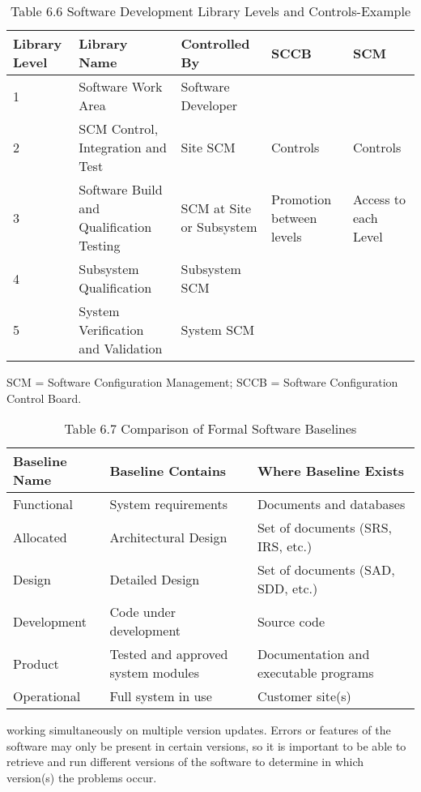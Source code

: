 \documentclass[8pt,twocolumn]{amsart}
\theoremstyle{plain}
\begin{document}
\begin{table*}[!h]
\caption{Table 6.6 Software Development Library Levels and Controls-Example}
\begin{adjustbox}{width=1\textwidth}
\begin{tabular}{|p{1.5cm}|l|l|p{3cm}|l|}
\hline
Library Level &Library Name & Controlled By & SCCB & SCM\\
\hline
1& Software Work Area & Software Developer &  & \\
\cline{1-3}
2& SCM Control, Integration and Test & Site SCM & Controls & Controls\\
\cline{1-3}
3& Software Build and Qualification Testing & SCM at Site or Subsystem & Promotion between levels & Access to each Level\\
\cline{1-3}
4& Subsystem Qualification & Subsystem SCM & &\\
\cline{1-3}
5& System Verification and Validation & System SCM &&\\
\hline
\end{tabular}
\end{adjustbox}
SCM = Software Configuration Management; SCCB = Software Configuration Control Board.
\end{table*}

\begin{table*}[h!]
\caption{Table 6.7 Comparison of Formal Software Baselines}
\begin{adjustbox}{width=1\textwidth}
\begin{tabular}{|l|l|l|}
\hline
Baseline Name & Baseline Contains & Where Baseline Exists\\
\hline
Functional & System requirements & Documents and databases \\
\hline
Allocated& Architectural Design & Set of documents (SRS, IRS, etc.)\\
\hline
Design& Detailed Design & Set of documents (SAD, SDD, etc.)\\
\hline
Development& Code under development & Source code \\
\hline
Product& Tested and approved system modules & Documentation and executable programs\\
\hline
Operational & Full system in use & Customer site(s)\\
\hline
\end{tabular}
\end{adjustbox}
\end{table*}



working simultaneously on multiple version updates. Errors or features of the software may only be present in certain versions, so it is important to be able to retrieve and run different versions of the software to determine in which version(s) the problems occur.
\end{document}
